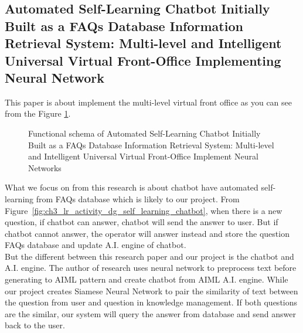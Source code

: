 \documentclass[12pt,oneside,openright,a4paper]{cpe-english-project}
\begin{document}
\subsection{Automated Self-Learning Chatbot Initially Built as a FAQs Database Information Retrieval
System: Multi-level and Intelligent Universal Virtual Front-Office Implementing Neural Network}
This paper is about implement the multi-level virtual front office as you can see from the Figure
\ref*{fig:ch3_lr_self_learning_chatbot}. 
\begin{figure}[h!]
  \centering
  \setlength{\fboxrule}{0.2mm}
  \setlength{\fboxsep}{0.5cm}
  \caption{Functional schema of Automated Self-Learning Chatbot Initially Built as a FAQs
  Database Information Retrieval System: Multi-level and Intelligent Universal Virtual
  Front-Office Implement Neural Networks}
  \label{fig:ch3_lr_self_learning_chatbot}
\end{figure}

What we focus on from this research is about chatbot have automated self-learning from FAQs
database which is likely to our project. From Figure~\ref*{fig:ch3_lr_activity_dg_self_learning_chatbot},
when there is a new question, if chatbot can answer, chatbot will send the answer to user.
But if chatbot cannot answer, the operator will answer instead and store the question FAQs
database and update A.I. engine of chatbot.\\
But the different between this research paper and our project is the chatbot and A.I. engine.
The author of research uses neural network to preprocess text before generating to AIML
pattern and create chatbot from AIML A.I. engine. While our project creates Siamese Neural
Network to pair the similarity of text between the question from user and question in
knowledge management. If both questions are the similar, our system will query the answer
from database and send answer back to the user.
\end{document}

